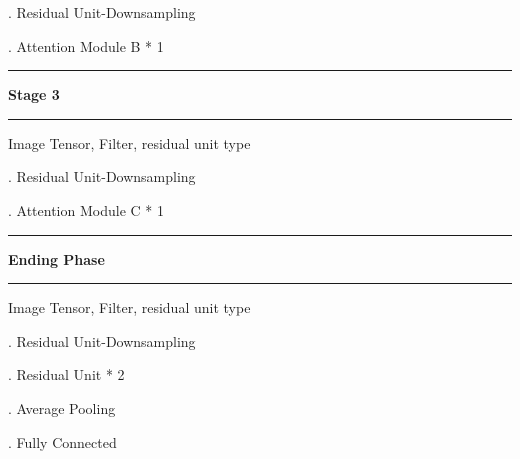 \documentclass{article}
\newcommand\Algphase[1]{%

\vspace*{-.7\baselineskip}\Statex\hspace*{\dimexpr-\algorithmicindent-2pt\relax}\rule{\textwidth}{0.4pt}%

\Statex\hspace*{-\algorithmicindent}\textbf{#1}%

\vspace*{-.7\baselineskip}\Statex\hspace*{\dimexpr-\algorithmicindent-2pt\relax}\rule{\textwidth}{0.4pt}%

}
\begin{document}
\begin{algorithm}
\begin{algorithmic}
. Residual Unit-Downsampling  

. Attention Module B * 1  

\EndProcedure\qquad\qquad\qquad\qquad\qquad\qquad\qquad\qquad\qquad{ }

\Algphase{Stage 3}

\Require Image Tensor, Filter, residual unit type 

\Procedure{}{} 

. Residual Unit-Downsampling  

. Attention Module C * 1  

\EndProcedure\qquad\qquad\qquad\qquad\qquad\qquad\qquad\qquad\qquad{}

\Algphase{Ending Phase}

\Require Image Tensor, Filter, residual unit type 
\Procedure{}{} 

. Residual Unit-Downsampling  

. Residual Unit * 2 

. Average Pooling  

. Fully Connected 


\EndProcedure\qquad\qquad\qquad\qquad\qquad\qquad\qquad\qquad\qquad{}


\end{algorithmic}

\end{algorithm}
\end{document}
